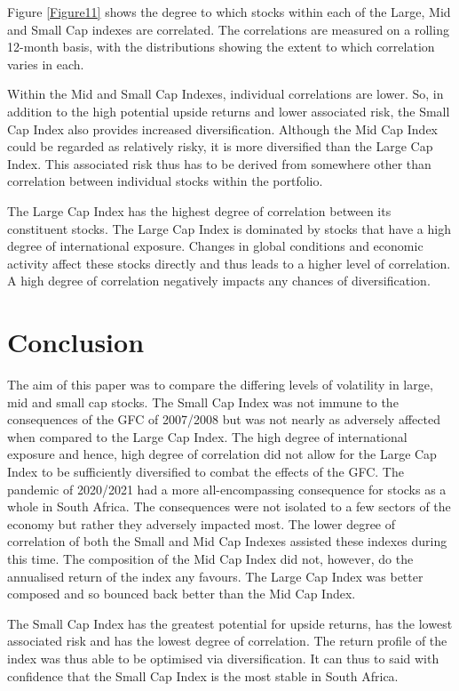 \documentclass[11pt,preprint, authoryear]{elsarticle}
\numberwithin{equation}{section}
\numberwithin{figure}{section}
\numberwithin{table}{section}
\begin{document}
Figure \ref{Figure11} shows the degree to which stocks within each of
the Large, Mid and Small Cap indexes are correlated. The correlations
are measured on a rolling 12-month basis, with the distributions showing
the extent to which correlation varies in each.

Within the Mid and Small Cap Indexes, individual correlations are lower.
So, in addition to the high potential upside returns and lower
associated risk, the Small Cap Index also provides increased
diversification. Although the Mid Cap Index could be regarded as
relatively risky, it is more diversified than the Large Cap Index. This
associated risk thus has to be derived from somewhere other than
correlation between individual stocks within the portfolio.

The Large Cap Index has the highest degree of correlation between its
constituent stocks. The Large Cap Index is dominated by stocks that have
a high degree of international exposure. Changes in global conditions
and economic activity affect these stocks directly and thus leads to a
higher level of correlation. A high degree of correlation negatively
impacts any chances of diversification.

\hypertarget{conclusion}{%
\section{\texorpdfstring{Conclusion
\label{Conclusion}}{Conclusion }}\label{conclusion}}

The aim of this paper was to compare the differing levels of volatility
in large, mid and small cap stocks. The Small Cap Index was not immune
to the consequences of the GFC of 2007/2008 but was not nearly as
adversely affected when compared to the Large Cap Index. The high degree
of international exposure and hence, high degree of correlation did not
allow for the Large Cap Index to be sufficiently diversified to combat
the effects of the GFC. The pandemic of 2020/2021 had a more
all-encompassing consequence for stocks as a whole in South Africa. The
consequences were not isolated to a few sectors of the economy but
rather they adversely impacted most. The lower degree of correlation of
both the Small and Mid Cap Indexes assisted these indexes during this
time. The composition of the Mid Cap Index did not, however, do the
annualised return of the index any favours. The Large Cap Index was
better composed and so bounced back better than the Mid Cap Index.

The Small Cap Index has the greatest potential for upside returns, has
the lowest associated risk and has the lowest degree of correlation. The
return profile of the index was thus able to be optimised via
diversification. It can thus to said with confidence that the Small Cap
Index is the most stable in South Africa.
\end{document}
